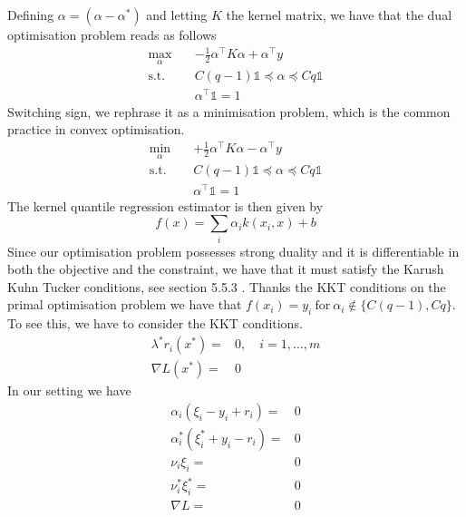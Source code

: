 Defining $\alpha=(\alpha-\alpha^*)$ and letting $K$ the kernel matrix, we have that the dual optimisation problem reads as follows
\begin{equation}\label{eq:kqr_min6}
    \begin{aligned}
        \max_{\alpha} \quad & -\frac{1}{2}\alpha^\intercal K\alpha+\alpha^\intercal y\\
    \textrm{s.t.} \quad & 
    C(q-1)\mathbb{1}\preceq \alpha \preceq Cq\mathbb{1}\\
    &\alpha^\intercal\mathbb{1}=1
    \end{aligned}
    \end{equation}
Switching sign, we rephrase it as a minimisation problem, which is the common practice in convex optimisation.
\begin{equation}\label{eq:kqr_min7}
    \begin{aligned}
        \min_{\alpha} \quad & +\frac{1}{2}\alpha^\intercal K\alpha-\alpha^\intercal y\\
    \textrm{s.t.} \quad & 
    C(q-1)\mathbb{1}\preceq \alpha \preceq Cq\mathbb{1}\\
    &\alpha^\intercal\mathbb{1}=1
    \end{aligned}
    \end{equation}
The kernel quantile regression estimator is then given by
\begin{equation}
    f(x)=\sum\limits_i \alpha_i k(x_i, x)+b
\end{equation}
Since our optimisation problem possesses strong duality and it is differentiable in both the objective and the constraint, we have that it must satisfy the Karush Kuhn Tucker conditions, see section 5.5.3 \cite{boyd2004convex}.
Thanks the KKT conditions on the primal optimisation problem we have that $f(x_i)=y_i \ \mathrm{for} \ \alpha_i \not \in \{C(q-1), Cq\}$. 
To see this, we have to consider the KKT conditions.
\begin{equation}
    \begin{aligned}
    \lambda^* r_i(x^*)=&0, \quad i=1,\dots,m
    \\
    \nabla L(x^*)=&0
\end{aligned}
\end{equation}
In our setting we have
\begin{equation}
    \begin{aligned}
        \alpha_i(\xi_i-y_i+r_i)=&0
        \\
        \alpha_i^*(\xi_i^*+y_i-r_i)=&0
        \\
        \nu_i \xi_i=&0
        \\
        \nu_i^* \xi_i^*=&0
        \\
        \nabla L =&0
    \end{aligned}
\end{equation}

